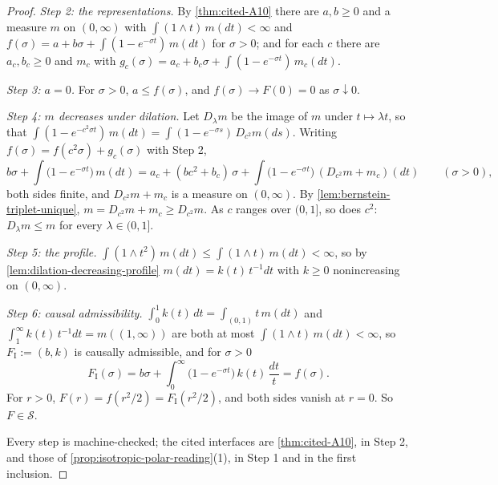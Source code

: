 \begin{proof}
\emph{Step 2: the representations.} By \ref{thm:cited-A10} there are $a, b \ge 0$ and a measure $m$
on $(0,\infty)$ with $\int(1 \wedge t)\,m(dt) < \infty$ and
$f(\sigma) = a + b\sigma + \int(1 - e^{-\sigma t})\,m(dt)$ for $\sigma > 0$; and for each $c$ there
are $a_c, b_c \ge 0$ and $m_c$ with $g_c(\sigma) = a_c + b_c\sigma + \int(1 - e^{-\sigma t})\,m_c(dt)$.

\emph{Step 3: $a = 0$.} For $\sigma > 0$, $a \le f(\sigma)$, and $f(\sigma) \to F(0) = 0$ as
$\sigma \downarrow 0$.

\emph{Step 4: $m$ decreases under dilation.} Let $D_\lambda m$ be the image of $m$ under
$t \mapsto \lambda t$, so that
$\int(1 - e^{-c^2\sigma t})\,m(dt) = \int(1 - e^{-\sigma s})\,D_{c^2}m(ds)$. Writing
$f(\sigma) = f(c^2\sigma) + g_c(\sigma)$ with Step 2,
\[
  b\sigma + \int\bigl(1 - e^{-\sigma t}\bigr)\,m(dt)
  = a_c + (bc^2 + b_c)\,\sigma + \int\bigl(1 - e^{-\sigma t}\bigr)\,(D_{c^2}m + m_c)(dt)
  \qquad (\sigma > 0),
\]
both sides finite, and $D_{c^2}m + m_c$ is a measure on $(0,\infty)$. By
\ref{lem:bernstein-triplet-unique}, $m = D_{c^2}m + m_c \ge D_{c^2}m$. As $c$ ranges over $(0,1]$,
so does $c^2$: $D_\lambda m \le m$ for every $\lambda \in (0,1]$.

\emph{Step 5: the profile.} $\int(1 \wedge t^2)\,m(dt) \le \int(1 \wedge t)\,m(dt) < \infty$, so by
\ref{lem:dilation-decreasing-profile} $m(dt) = k(t)\,t^{-1}dt$ with $k \ge 0$ nonincreasing on
$(0,\infty)$.

\emph{Step 6: causal admissibility.} $\int_0^1 k(t)\,dt = \int_{(0,1)} t\,m(dt)$ and
$\int_1^\infty k(t)\,t^{-1}dt = m((1,\infty))$ are both at most $\int(1 \wedge t)\,m(dt) < \infty$,
so $F_{\mathrm I} := (b, k)$ is causally admissible, and for $\sigma > 0$
\[
  F_{\mathrm I}(\sigma) = b\sigma + \int_0^\infty\bigl(1 - e^{-\sigma t}\bigr)\,k(t)\,\frac{dt}{t}
  = f(\sigma) .
\]
For $r > 0$, $F(r) = f(r^2/2) = F_{\mathrm I}(r^2/2)$, and both sides vanish at $r = 0$. So
$F \in \mathcal{S}$.

Every step is machine-checked; the cited interfaces are \ref{thm:cited-A10}, in Step 2, and those of
\ref{prop:isotropic-polar-reading}(1), in Step 1 and in the first inclusion.
\end{proof}

